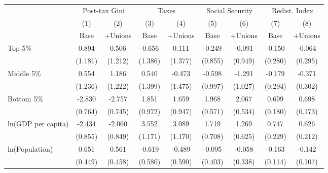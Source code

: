 \begin{tabular}{l*{8}{c}}
\toprule
                    &\multicolumn{2}{c}{Post-tax Gini}&\multicolumn{2}{c}{Taxes}&\multicolumn{2}{c}{Social Security}&\multicolumn{2}{c}{Redist. Index}\\\cmidrule(lr){2-3}\cmidrule(lr){4-5}\cmidrule(lr){6-7}\cmidrule(lr){8-9}
                    &\multicolumn{1}{c}{(1)}&\multicolumn{1}{c}{(2)}&\multicolumn{1}{c}{(3)}&\multicolumn{1}{c}{(4)}&\multicolumn{1}{c}{(5)}&\multicolumn{1}{c}{(6)}&\multicolumn{1}{c}{(7)}&\multicolumn{1}{c}{(8)}\\
                    &\multicolumn{1}{c}{Base}&\multicolumn{1}{c}{+Unions}&\multicolumn{1}{c}{Base}&\multicolumn{1}{c}{+Unions}&\multicolumn{1}{c}{Base}&\multicolumn{1}{c}{+Unions}&\multicolumn{1}{c}{Base}&\multicolumn{1}{c}{+Unions}\\
\midrule
Top 5\%             &       0.894&       0.506&      -0.656&       0.111&      -0.249&      -0.091&      -0.150&      -0.064\\
                    &     (1.181)&     (1.212)&     (1.386)&     (1.377)&     (0.855)&     (0.949)&     (0.280)&     (0.295)\\
\addlinespace
Middle 5\%          &       0.554&       1.186&       0.540&      -0.473&      -0.598&      -1.291&      -0.179&      -0.371\\
                    &     (1.236)&     (1.222)&     (1.399)&     (1.475)&     (0.997)&     (1.027)&     (0.294)&     (0.302)\\
\addlinespace
Bottom 5\%          &      -2.830&      -2.757&       1.851&       1.659&       1.968&       2.067&       0.699&       0.698\\
                    &     (0.764)&     (0.745)&     (0.972)&     (0.947)&     (0.571)&     (0.534)&     (0.180)&     (0.173)\\
\addlinespace
ln(GDP per capita)  &      -2.434&      -2.060&       3.552&       3.089&       1.719&       1.269&       0.747&       0.626\\
                    &     (0.855)&     (0.849)&     (1.171)&     (1.170)&     (0.708)&     (0.625)&     (0.229)&     (0.212)\\
\addlinespace
ln(Population)      &       0.651&       0.561&      -0.619&      -0.489&      -0.095&      -0.058&      -0.163&      -0.142\\
                    &     (0.449)&     (0.458)&     (0.580)&     (0.590)&     (0.403)&     (0.338)&     (0.114)&     (0.107)\\

\end{tabular}
